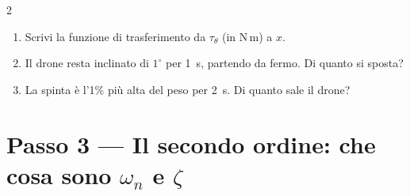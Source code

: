 \documentclass[11pt,a4paper]{article}
\begin{document}
\begin{esercizio}{2}
\begin{enumerate}[label=(\alph*)]
  \item Scrivi la funzione di trasferimento da $\tau_\theta$ (in N\,m) a $x$.
  \item Il drone resta inclinato di $1^\circ$ per 1~s, partendo da fermo. Di quanto si sposta?
  \item La spinta è l'1\% più alta del peso per 2~s. Di quanto sale il drone?
\end{enumerate}
\end{esercizio}

\section{Passo 3 --- Il secondo ordine: che cosa sono $\omega_n$ e $\zeta$}
\end{document}
